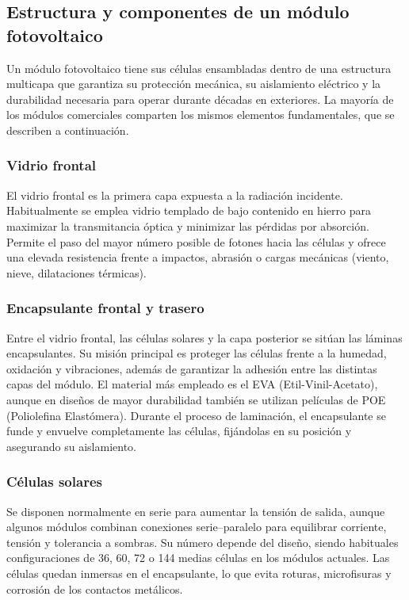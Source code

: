 \subsection{Estructura y componentes de un módulo fotovoltaico}

Un módulo fotovoltaico tiene sus células ensambladas dentro de una estructura multicapa que garantiza su protección mecánica, su aislamiento eléctrico y la durabilidad necesaria para operar durante décadas en exteriores. La mayoría de los módulos comerciales comparten los mismos elementos fundamentales, que se describen a continuación.

\subsubsection{Vidrio frontal}

El vidrio frontal es la primera capa expuesta a la radiación incidente. Habitualmente se emplea vidrio templado de bajo contenido en hierro para maximizar la transmitancia óptica y minimizar las pérdidas por absorción.  Permite el paso del mayor número posible de fotones hacia las células y ofrece una elevada resistencia frente a impactos, abrasión o cargas mecánicas (viento, nieve, dilataciones térmicas).

\subsubsection{Encapsulante frontal y trasero}

Entre el vidrio frontal, las células solares y la capa posterior se sitúan las láminas encapsulantes. Su misión principal es proteger las células frente a la humedad, oxidación y vibraciones, además de garantizar la adhesión entre las distintas capas del módulo.
El material más empleado es el EVA (Etil-Vinil-Acetato), aunque en diseños de mayor durabilidad también se utilizan películas de POE (Poliolefina Elastómera). Durante el proceso de laminación, el encapsulante se funde y envuelve completamente las células, fijándolas en su posición y asegurando su aislamiento.

\subsubsection{Células solares}

Se disponen normalmente en serie para aumentar la tensión de salida, aunque algunos módulos combinan conexiones serie–paralelo para equilibrar corriente, tensión y tolerancia a sombras. Su número depende del diseño, siendo habituales configuraciones de 36, 60, 72 o 144 medias células en los módulos actuales. Las células quedan inmersas en el encapsulante, lo que evita roturas, microfisuras y corrosión de los contactos metálicos.

